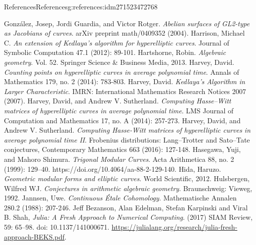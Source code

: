 \documentclass[oneside,10pt,]{book}
\numberwithin{equation}{section}
\begin{document}
\begin{references-chapter-numberless}{References}{}{References}{}{}{g:references:idm271523472768}
\begin{thebibliography}{9}
\hypertarget{x:biblio:bib-gonzales-guardia-rotger}{}González, Josep, Jordi Guardia, and Victor Rotger. \textit{Abelian surfaces of GL2-type as Jacobians of curves}. arXiv preprint math\slash{}0409352 (2004).
\hypertarget{x:biblio:bib-harrison-hyperelliptic}{}Harrison, Michael C. \textit{An extension of Kedlaya's algorithm for hyperelliptic curves}. Journal of Symbolic Computation 47.1 (2012): 89-101.
\hypertarget{x:biblio:bib-hartshorne}{}Hartshorne, Robin. \textit{Algebraic geometry}. Vol. 52. Springer Science \& Business Media, 2013.
\hypertarget{x:biblio:bib-harvey-average}{}Harvey, David. \textit{Counting points on hyperelliptic curves in average polynomial time}. Annals of Mathematics 179, no. 2 (2014): 783-803.
\hypertarget{x:biblio:bib-harvey-sqrtp}{}Harvey, David. \textit{Kedlaya's Algorithm in Larger Characteristic}. IMRN: International Mathematics Research Notices 2007 (2007).
\hypertarget{x:biblio:bib-harvey-sutherland}{}Harvey, David, and Andrew V. Sutherland. \textit{Computing Hasse–Witt matrices of hyperelliptic curves in average polynomial time}. LMS Journal of Computation and Mathematics 17, no. A (2014): 257-273.
\hypertarget{x:biblio:bib-harvey-sutherland-ii}{}Harvey, David, and Andrew V. Sutherland. \textit{Computing Hasse-Witt matrices of hyperelliptic curves in average polynomial time II}. Frobenius distributions: Lang–Trotter and Sato–Tate conjectures, Contemporary Mathematics 663 (2016): 127-148.
\hypertarget{x:biblio:bib-hasegawa-shimura}{}Hasegawa, Yuji, and Mahoro Shimura. \textit{Trigonal Modular Curves}. Acta Arithmetica 88, no. 2 (1999): 129–40. https:\slash{}\slash{}doi.org\slash{}10.4064\slash{}aa-88-2-129-140.
\hypertarget{x:biblio:bib-hida-geometric}{}Hida, Haruzo. \textit{Geometric modular forms and elliptic curves}. World Scientific, 2012.
\hypertarget{x:biblio:bib-hulsbergen}{}Hulsbergen, Wilfred WJ. \textit{Conjectures in arithmetic algebraic geometry}. Braunschweig: Vieweg, 1992.
\hypertarget{x:biblio:bib-jannsen}{}Jannsen, Uwe. \textit{Continuous Étale Cohomology}. Mathematische Annalen 280.2 (1988): 207-246.
\hypertarget{x:biblio:bib-julia}{}Jeff Bezanson, Alan Edelman, Stefan Karpinski and Viral B. Shah, \textit{Julia: A Fresh Approach to Numerical Computing}.  (2017) SIAM Review, 59: 65–98. doi: 10.1137\slash{}141000671. \url{https://julialang.org/research/julia-fresh-approach-BEKS.pdf}.

\end{thebibliography}
\end{references-chapter-numberless}
\end{document}

